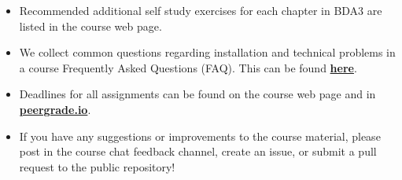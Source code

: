 \begin{itemize}
\item Recommended additional self study exercises for each chapter in BDA3 are listed in the course web page.
\item We collect common questions regarding installation and technical problems in a course Frequently Asked Questions (FAQ). This can be found \href{https://github.com/avehtari/BDA_course_Aalto/blob/master/FAQ.md}{\textbf{here}}.
\item Deadlines for all assignments can be found on the course web page and in \href{peergrade.io}{\textbf{peergrade.io}}.
\item If you have any suggestions or improvements to the course material, please post in the course chat feedback channel, create an issue, or submit a pull request to the public repository!
\end{itemize}
